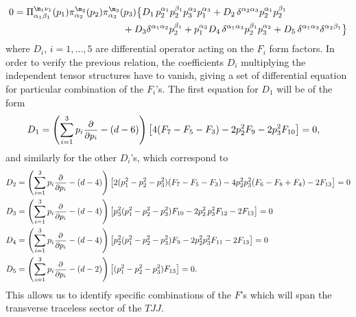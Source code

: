 \documentclass[a4paper,11pt,openright,twoside]{book}
\let\a=\alpha   \let\b=\beta   \let\g=\gamma   \let\d=\delta
\let\n=\nu      \let\x=\xi     \let\p=\pi      \let\r=\rho
\newcommand{\sdfrac}[2]{\mbox{\small$\displaystyle\frac{#1}{#2}$}}
\numberwithin{equation}{section}
\begin{document}
{{\begin{subequations}
	\begin{align}
		0&=\Pi^{\m_1\n_1}_{\a_1\b_1}(p_1)\pi^{\m_2}_{\a_2}(p_2)\pi^{\m_3}_{\a_3}(p_3)\big\{D_1\,p_2^{\a_1}p_2^{\b_1}p_3^{\a_2}p_1^{\a_3}+ D_2\,\d^{\a_2\a_3} p_2^{\a_1}p_2^{\b_1} \notag\\
		&\hspace{4cm}+ D_3\d^{\a_1\a_2}p_2^{\b_1}+p_1^{\a_3}D_4\,\d^{\a_1\a_3}p_2^{\b_1}p_3^{\a_2}+D_5\,\d^{\a_1\a_3}\d^{\a_2\b_1}\big\}
	\end{align}
\end{subequations}
where $D_i$, $i=1,\dots,5$ are differential operator acting on the $F_i$ form factors. In order to verify the previous relation, the coefficients $D_i$ multiplying the independent tensor structures have to vanish, giving a set of differential equation for particular combination of the $F_i$'s. The first equation for $D_1$ will be of the form
\begin{align}
	&D_1=\left(\sum_{i=1}^3p_i\sdfrac{\partial}{\partial p_i}-(d-6)\right)\big[ 4(F_7-F_5-F_3)-2p_2^2F_9-2p_3^2F_{10}\big]=0,
\end{align}
and similarly for the other $D_i$'s, which correspond to
\begin{align}
	&D_2=\left(\sum_{i=1}^3p_i\sdfrac{\partial}{\partial p_i}-(d-4)\right)\big[2(p_1^2-p_2^2-p_3^2)(F_7-F_5-F_3)-4p_2^2p_3^2(F_6-F_8+F_4)-2F_{13}\big]=0\\
	&D_3=\left(\sum_{i=1}^3p_i\sdfrac{\partial}{\partial p_i}-(d-4)\right)\big[p_3^2(p_1^2-p_2^2-p_3^2)F_{10}-2p_2^2\,p_3^2 F_{12}-2F_{13}\big]=0\\
	&D_4=\left(\sum_{i=1}^3p_i\sdfrac{\partial}{\partial p_i}-(d-4)\right)\big[p_2^2(p_1^2-p_2^2-p_3^2)F_9-2p_2^2p_3^2F_{11}-2F_{13}\big]=0\\
	&D_5=\left(\sum_{i=1}^3p_i\sdfrac{\partial}{\partial p_i}-(d-2)\right)\big[(p_1^2-p_2^2-p_3^2)F_{13}\big]=0.
\end{align}
This allows us to identify specific combinations of the $F$'s which will span the transverse traceless sector of the $TJJ$.

}}
\end{document}
